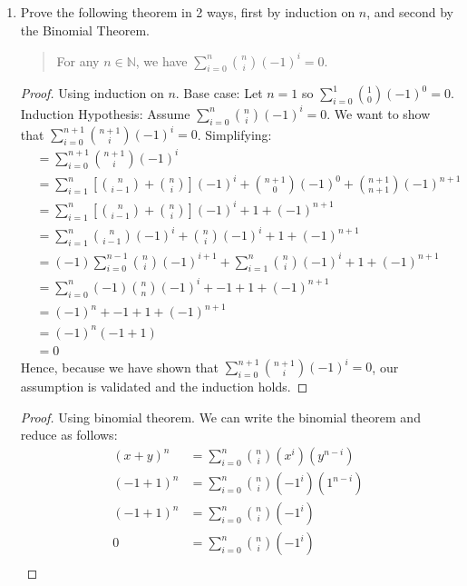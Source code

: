 \documentclass[12pt]{article}
\newcommand{\N}{\mathbb{N}}
\begin{document}
\begin{enumerate}
\item Prove the following theorem in 2 ways, first by induction on $n$, and second by the Binomial Theorem.

\begin{quote}
For any $n\in \N$, we have $\displaystyle\sum_{i=0}^n {n\choose i}(-1)^i=0$.
\end{quote}

\begin{proof} Using induction on $n$.\hfill \break \break
Base case: Let $n = 1$ so $\displaystyle\sum_{i=0}^1 {1\choose 0}(-1)^0=0$. \hfill \break \break
Induction Hypothesis: Assume $\displaystyle\sum_{i=0}^n {n\choose i}(-1)^i=0$. \hfill \break \break
We want to show that $\sum_{i=0}^{n + 1} {n+1\choose i}(-1)^i = 0$. Simplifying: 
\begin{align*}
&= \sum_{i=0}^{n + 1} {n+1\choose i}(-1)^i \\
&= \sum_{i=1}^{n} \left[{n\choose i - 1} + {n\choose i}\right](-1)^i + {n +1 \choose 0}(-1)^0 + {n +1 \choose n+1}(-1)^{n+1} \\
&= \sum_{i=1}^{n } \left[{n\choose i - 1} + {n\choose i}\right](-1)^i + 1 + (-1)^{n+1} \\
&= \sum_{i=1}^{n } {n\choose i - 1}(-1)^i + {n\choose i}(-1)^i + 1 + (-1)^{n+1} \\
&= (-1)\sum_{i=0}^{n - 1} {n\choose i}(-1)^{i+1} + \sum_{i=1}^{n}{n\choose i}(-1)^i + 1 + (-1)^{n+1} \\
&= \sum_{i=0}^{n} (-1){n\choose n}(-1)^{i} + -1 + 1 + (-1)^{n+1} \\
&= (-1)^n + -1 + 1 + (-1)^{n+1} \\
&= (-1)^n (-1 + 1) \\
&= 0
\end{align*}
Hence, because we have shown that $\sum_{i=0}^{n + 1} {n+1\choose i}(-1)^i = 0$, our assumption is validated and the induction holds. 
\end{proof}

\begin{proof} Using binomial theorem. \hfill \break \break
We can write the binomial theorem and reduce as follows:
\begin{align*}
(x + y)^n &= \sum_{i=0}^{n} {n\choose i}(x^i)(y^{n-i}) \\
(-1 + 1)^n &= \sum_{i=0}^{n} {n\choose i}(-1^i)(1^{n-i}) \\
(-1 + 1)^n &= \sum_{i=0}^{n} {n\choose i}(-1^i) \\
0 &= \sum_{i=0}^{n} {n\choose i}(-1^i) \\
\end{align*}
\end{proof}


\end{enumerate}
\end{document}
